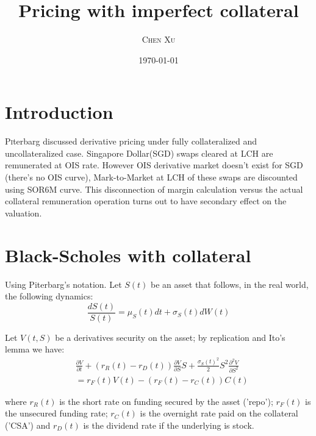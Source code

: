 \documentclass[twoside,twocolumn]{article}
\title{Pricing with imperfect collateral} %
\author{%
\textsc{Chen Xu} \\%
\normalsize %
}
\date{\today} %
\begin{document}
\maketitle


\section{Introduction}

\lettrine[nindent=0em,lines=3]{P} iterbarg\cite{Piterbarg:2010} discussed derivative pricing under fully collateralized and uncollateralized case. Singapore Dollar(SGD) swaps cleared at LCH are remunerated at OIS rate. However OIS derivative market doesn't exist for SGD (there's no OIS curve), Mark-to-Market at LCH of these swaps are discounted using SOR6M curve. This disconnection of margin calculation versus the actual collateral remuneration operation turns out to have secondary effect on the valuation. 




\section{Black-Scholes with collateral}

Using Piterbarg\cite{Piterbarg:2010}'s notation. Let $S(t)$ be an asset that follows, in the real world, the following dynamics:
\begin{equation}
\frac{dS(t)}{S(t)}= \mu_{S}(t)dt+\sigma_{S}(t)dW(t) \nonumber
\end{equation}

Let $V(t, S)$ be a derivatives security on the asset; by replication and Ito's lemma we have:
\begin{align*}
&\frac{\partial V}{\partial t} + (r_{R}(t)-r_{D}(t))\frac{\partial V}{\partial S}S + \frac{\sigma_{S}(t)^2}{2}S^2\frac{\partial^2 V}{\partial S^2}\\
&= r_{F}(t)V(t) - (r_{F}(t) - r_{C}(t))C(t)
\end{align*}

where $r_{R}(t)$ is the short rate on funding secured by the asset ('repo'); $r_{F}(t)$ is the unsecured funding rate; $r_{C}(t)$ is the overnight rate paid on the collateral ('CSA') and $r_{D}(t)$ is the dividend rate if the underlying is stock.
\end{document}
